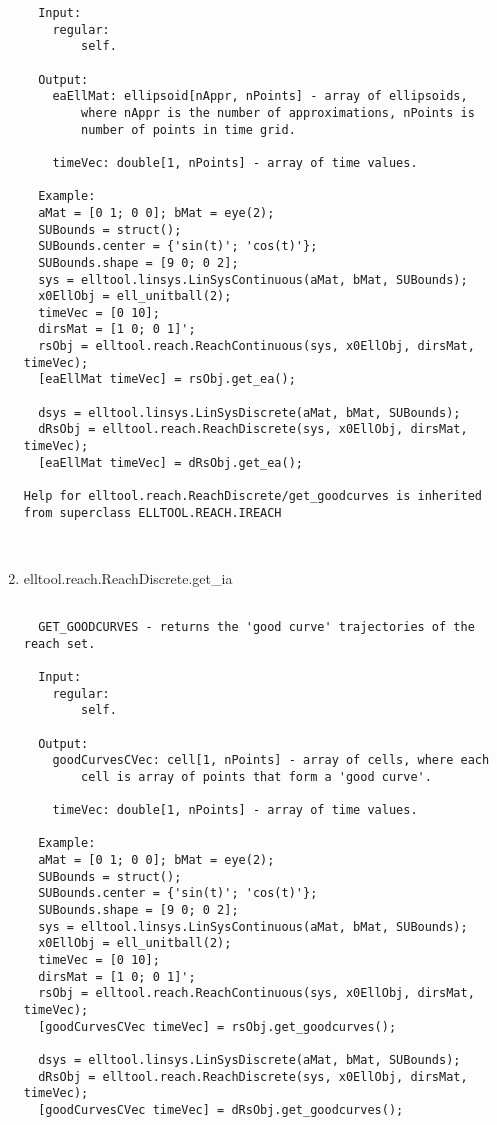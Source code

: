 \begin{enumerate}
\begin{lstlisting}
  Input:
    regular:
        self.

  Output:
    eaEllMat: ellipsoid[nAppr, nPoints] - array of ellipsoids,
        where nAppr is the number of approximations, nPoints is
        number of points in time grid.

    timeVec: double[1, nPoints] - array of time values.

  Example:
  aMat = [0 1; 0 0]; bMat = eye(2);
  SUBounds = struct();
  SUBounds.center = {'sin(t)'; 'cos(t)'};
  SUBounds.shape = [9 0; 0 2];
  sys = elltool.linsys.LinSysContinuous(aMat, bMat, SUBounds);
  x0EllObj = ell_unitball(2);
  timeVec = [0 10];
  dirsMat = [1 0; 0 1]';
  rsObj = elltool.reach.ReachContinuous(sys, x0EllObj, dirsMat, timeVec);
  [eaEllMat timeVec] = rsObj.get_ea();

  dsys = elltool.linsys.LinSysDiscrete(aMat, bMat, SUBounds);
  dRsObj = elltool.reach.ReachDiscrete(sys, x0EllObj, dirsMat, timeVec);
  [eaEllMat timeVec] = dRsObj.get_ea();

Help for elltool.reach.ReachDiscrete/get_goodcurves is inherited from superclass ELLTOOL.REACH.IREACH



\end{lstlisting}
\fontfamily{\familydefault}
\selectfont
\item {elltool.reach.ReachDiscrete.get\_ia}
\selectfont
\begin{lstlisting}

  GET_GOODCURVES - returns the 'good curve' trajectories of the reach set.

  Input:
    regular:
        self.

  Output:
    goodCurvesCVec: cell[1, nPoints] - array of cells, where each
        cell is array of points that form a 'good curve'.

    timeVec: double[1, nPoints] - array of time values.

  Example:
  aMat = [0 1; 0 0]; bMat = eye(2);
  SUBounds = struct();
  SUBounds.center = {'sin(t)'; 'cos(t)'};
  SUBounds.shape = [9 0; 0 2];
  sys = elltool.linsys.LinSysContinuous(aMat, bMat, SUBounds);
  x0EllObj = ell_unitball(2);
  timeVec = [0 10];
  dirsMat = [1 0; 0 1]';
  rsObj = elltool.reach.ReachContinuous(sys, x0EllObj, dirsMat, timeVec);
  [goodCurvesCVec timeVec] = rsObj.get_goodcurves();

  dsys = elltool.linsys.LinSysDiscrete(aMat, bMat, SUBounds);
  dRsObj = elltool.reach.ReachDiscrete(sys, x0EllObj, dirsMat, timeVec);
  [goodCurvesCVec timeVec] = dRsObj.get_goodcurves();


\end{lstlisting}
\end{enumerate}
